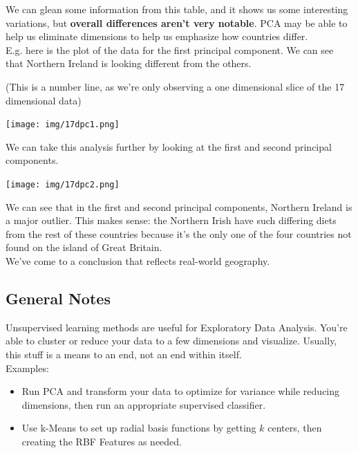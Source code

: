 \documentclass[english, 10pt]{article}
\begin{document}
\hfill \break We can glean some information from this table, and it shows us some interesting variations, but \textbf{overall differences aren't very notable}. PCA may be able to help us eliminate dimensions to help us emphasize how countries differ.\\

E.g. here is the plot of the data for the first principal component. We can see that Northern Ireland is looking different from the others.



\hfill \break (This is a number line, as we're only observing a one dimensional slice of the 17 dimensional data)

{
\centering

\texttt{[image: img/17dpc1.png]} 

}

\hfill \break We can take this analysis further by looking at the first and second principal components.\\

{
\centering

\texttt{[image: img/17dpc2.png]} 

}

\hfill \break We can see that in the first and second principal components, Northern Ireland is a major outlier. This makes sense: the Northern Irish have such differing diets from the rest of these countries because it's the only one of the four countries not found on the island of Great Britain.\\

We've come to a conclusion that reflects real-world geography.

\subsection{General Notes}

Unsupervised learning methods are useful for Exploratory Data Analysis. You're able to cluster or reduce your data to a few dimensions and visualize. Usually, this stuff is a means to an end, not an end within itself.\\

Examples:

\begin{itemize}
	\item Run PCA and transform your data to optimize for variance while reducing dimensions, then run an appropriate supervised classifier.
	\item Use k-Means to set up radial basis functions by getting $k$ centers, then creating the RBF Features as needed.
\end{itemize}
\end{document}
